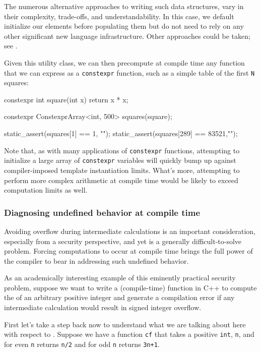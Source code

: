 \noindent The numerous alternative approaches to writing such data structures,
vary in their complexity, trade-offs, and understandability. In this
case, we default initialize our elements before populating them but do
not need to rely on any other significant new language infrastructure.
Other approaches could be taken; see .

Given this utility class, we can then precompute at compile time any
function that we can express as a \lstinline!constexpr! function, such as a
simple table of the first \lstinline!N! squares:

\begin{emcppslisting}[emcppsbatch=e3]
constexpr int square(int x) { return x * x; }

constexpr ConstexprArray<int, 500> squares(square);

static_assert(squares[1]   == 1,    "");
static_assert(squares[289] == 83521,"");
\end{emcppslisting}
    
\noindent Note that, as with many applications of \lstinline!constexpr! functions,
attempting to initialize a large array of \lstinline!constexpr! variables
will quickly bump up against compiler-imposed template instantiation
limits. What's more, attempting to perform more complex arithmetic at
compile time would be likely to exceed computation limits as well.

\subsubsection[Diagnosing undefined behavior at compile time]{Diagnosing undefined behavior at compile time}\label{diagnosing-undefined-behavior-at-compile-time}

Avoiding overflow during intermediate calculations is an important
consideration, especially from a security perspective, and yet is a
generally difficult-to-solve problem. Forcing computations to occur at
compile time brings the full power of the compiler to bear in addressing
such undefined behavior.

As an academically interesting example of this eminently practical
security problem, suppose we want to write a (compile-time) function in
C++ to compute the  of an arbitrary positive
integer and generate a compilation error if any intermediate calculation
would result in signed integer overflow.

First let's take a step back now to understand what we are talking about
here with respect to . Suppose we have a function
\lstinline!cf! that takes a positive \lstinline!int!, \lstinline!n!, and for even
\lstinline!n! returns \lstinline!n/2! and for odd \lstinline!n! returns
\lstinline!3n+1!.

